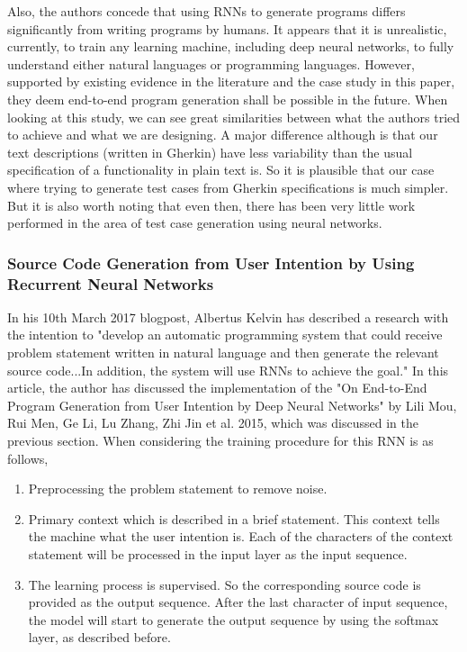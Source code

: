 \documentclass[conference, onecolumn, a4, 12pt]{IEEEtran}
\begin{document}
Also, the authors concede that using RNNs to generate programs differs
significantly from writing programs by humans. It appears that it is unrealistic, currently, to train any learning machine, including deep neural networks, to fully understand either natural languages or programming languages. However, supported
by existing evidence in the literature and the case study in
this paper, they deem end-to-end program generation shall be possible in the future.\newline
When looking at this study, we can see great similarities between what the authors tried to achieve and what we are designing. A major difference although is that our text descriptions (written in Gherkin) have less variability than the usual specification of a functionality in plain text is. So it is plausible that our case where trying to generate test cases from Gherkin specifications is much simpler. But it is also worth noting that even then, there has been very little work performed in the area of test case generation using neural networks.

\subsubsection{Source Code Generation from User Intention by Using Recurrent Neural Networks}
In his 10th March 2017 blogpost, Albertus Kelvin has described a research with the intention to "develop an automatic programming system that could receive problem statement written in natural language and then generate the relevant source code...In addition, the system will use RNNs to achieve the goal."\cite{a3} In this article, the author has discussed the implementation of the "On End-to-End Program Generation from User Intention by Deep Neural Networks" by Lili Mou, Rui Men, Ge Li, Lu Zhang, Zhi Jin et al. 2015, which was discussed in the previous section.\cite{a3}\newline
When considering the training procedure for this RNN is as follows,
\begin{enumerate}
	\item Preprocessing the problem statement to remove noise.
	\item Primary context which is described in a brief statement. 
	This context tells the machine what the user intention is. Each of the characters of the context statement will be processed in the input layer as the input sequence.
	\item The learning process is supervised. So the corresponding source code is provided as the output sequence. After the last character of input sequence, the model will start to generate the output sequence by using the softmax layer, as described before.
\end{enumerate}
\end{document}

